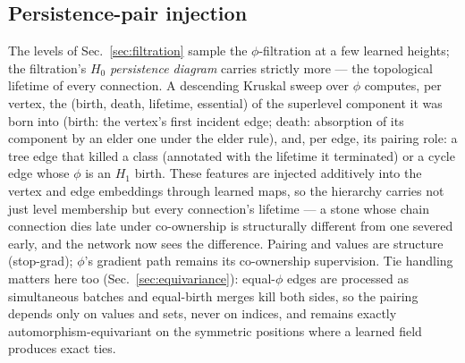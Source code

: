 \documentclass[11pt]{article}
\begin{document}
\subsection{Persistence-pair injection}
\label{sec:persistence}
The levels of Sec.~\ref{sec:filtration} sample the $\phi$-filtration at a
few learned heights; the filtration's $H_0$ \emph{persistence diagram}
carries strictly more --- the topological lifetime of every connection.
A descending Kruskal sweep over $\phi$ computes, per vertex, the (birth,
death, lifetime, essential) of the superlevel component it was born into
(birth: the vertex's first incident edge; death: absorption of its
component by an elder one under the elder rule), and, per edge, its
pairing role: a tree edge that killed a class (annotated with the
lifetime it terminated) or a cycle edge whose $\phi$ is an $H_1$ birth.
These features are injected additively into the vertex and edge
embeddings through learned maps, so the hierarchy carries not just level
membership but every connection's lifetime --- a stone whose chain
connection dies late under co-ownership is structurally different from
one severed early, and the network now sees the difference. Pairing and
values are structure (stop-grad); $\phi$'s gradient path remains its
co-ownership supervision. Tie handling matters here too
(Sec.~\ref{sec:equivariance}): equal-$\phi$ edges are processed as
simultaneous batches and equal-birth merges kill both sides, so the
pairing depends only on values and sets, never on indices, and remains
exactly automorphism-equivariant on the symmetric positions where a
learned field produces exact ties.
\end{document}
